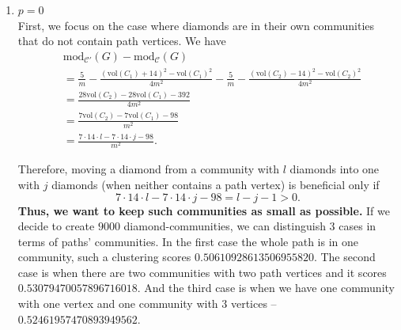 \documentclass[letterpaper,12pt]{article}
\begin{document}
\begin{enumerate}
      \item $p = 0$\\
            First, we focus on the case where diamonds are in their own communities that do not contain path vertices.
            We have
            \begin{align*}
                   & \text{mod}_{\mathcal{C'}}(G) - \text{mod}_{\mathcal{C}} (G)                                                                                       \\
                   & = \frac{5}{m} - \frac{(\text{vol}(C_1)+14)^2 - \text{vol}(C_1)^2}{4m^2} - \frac{5}{m} - \frac{(\text{vol}(C_2) - 14)^2 - \text{vol}(C_2)^2}{4m^2} \\
                   & = \frac{28\text{vol}(C_2) - 28\text{vol}(C_1) - 392}{4m^2}                                                                                        \\
                   & = \frac{7\text{vol}(C_2) - 7\text{vol}(C_1) - 98}{m^2}                                                                                            \\
                   & = \frac{7\cdot 14 \cdot l - 7 \cdot 14 \cdot j - 98}{m^2}.
            \end{align*}

            Therefore, moving a diamond from a community with $l$ diamonds into one with $j$ diamonds (when neither contains a path vertex) is beneficial only if
            \[
                  7\cdot 14 \cdot l - 7 \cdot 14 \cdot j - 98 = l - j - 1 > 0.
            \]
            \textbf{Thus, we want to keep such communities as small as possible.} If we decide to create $9000$ diamond-communities, we can distinguish $3$ cases in terms of paths' communities. In the first case the whole path is in one community, such a clustering scores $0.50610928613506955820$. The second case is when there are two communities with two path vertices and it scores $0.53079470057896716018$. And the third case is when we have one community with one vertex and one community with $3$ vertices -- $0.52461957470893949562$.


\end{enumerate}
\end{document}
